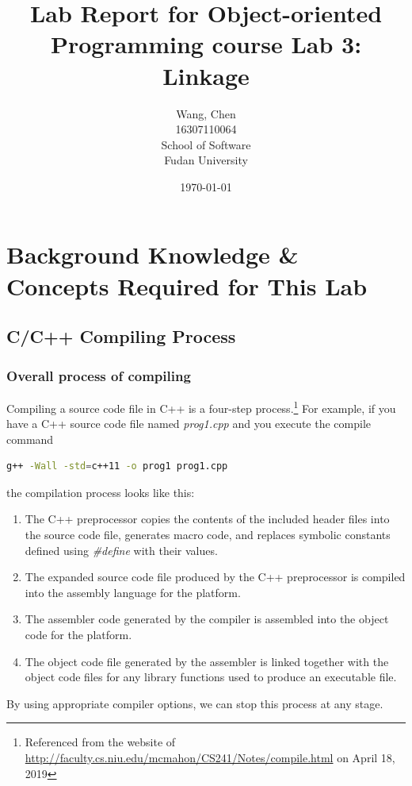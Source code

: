 \documentclass[a4paper]{report}
\title{Lab Report for Object-oriented Programming course \newline
 Lab 3: Linkage}
\author{Wang, Chen \\ 16307110064 \\ School of Software\\ Fudan University}
\date{\today}
\begin{document}
\maketitle

\tableofcontents

\chapter{Background Knowledge \& Concepts Required for This Lab}
\section{C/C++ Compiling Process}

\subsection{Overall process of compiling}
Compiling a source code file in C++ is a four-step process.\footnote{Referenced from the website of \url{http://faculty.cs.niu.edu/mcmahon/CS241/Notes/compile.html} on April 18, 2019}
 For example, if you have a C++ source code file named \emph{prog1.cpp} and you execute the compile command
 \begin{lstlisting}[language=bash]
g++ -Wall -std=c++11 -o prog1 prog1.cpp
\end{lstlisting}
the compilation process looks like this:
\begin{enumerate}
\item
The C++ preprocessor copies the contents of the included header files into the source code file, generates macro code, and replaces symbolic constants defined using \emph{\#define} with their values.
\item
The expanded source code file produced by the C++ preprocessor is compiled into the assembly language for the platform.
\item
The assembler code generated by the compiler is assembled into the object code for the platform.
\item
The object code file generated by the assembler is linked together with the object code files for any library functions used to produce an executable file.
\end{enumerate}
By using appropriate compiler options, we can stop this process at any stage.
\end{document}
